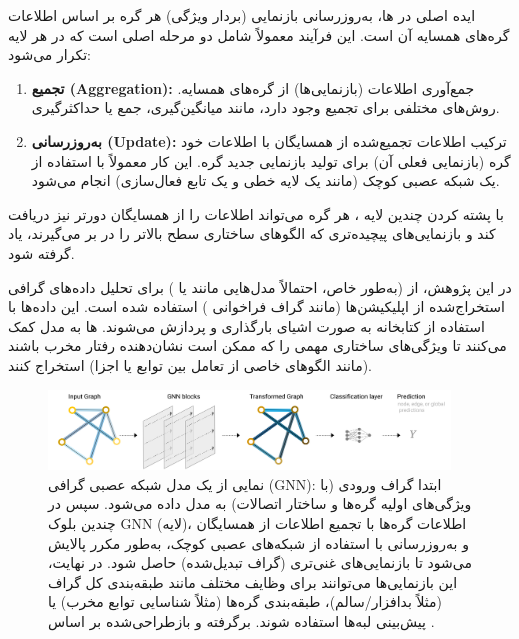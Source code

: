 ایده اصلی در ها، به‌روزرسانی بازنمایی (بردار ویژگی) هر گره بر اساس اطلاعات گره‌های همسایه آن است. این فرآیند معمولاً شامل دو مرحله اصلی است که در هر لایه  تکرار می‌شود:
\begin{enumerate}
    \item \textbf{تجمیع (Aggregation):} جمع‌آوری اطلاعات (بازنمایی‌ها) از گره‌های همسایه. روش‌های مختلفی برای تجمیع وجود دارد، مانند میانگین‌گیری، جمع یا حداکثرگیری.
    \item \textbf{به‌روزرسانی (Update):} ترکیب اطلاعات تجمیع‌شده از همسایگان با اطلاعات خود گره (بازنمایی فعلی آن) برای تولید بازنمایی جدید گره. این کار معمولاً با استفاده از یک شبکه عصبی کوچک (مانند یک لایه خطی و یک تابع فعال‌سازی) انجام می‌شود.
\end{enumerate}
با پشته کردن چندین لایه ، هر گره می‌تواند اطلاعات را از همسایگان دورتر نیز دریافت کند و بازنمایی‌های پیچیده‌تری که الگوهای ساختاری سطح بالاتر را در بر می‌گیرند، یاد گرفته شود.

در این پژوهش، از  (به‌طور خاص، احتمالاً مدل‌هایی مانند  \cite{Kipf2017} یا  \cite{Velickovic2018}) برای تحلیل داده‌های گرافی استخراج‌شده از اپلیکیشن‌ها (مانند گراف فراخوانی ) استفاده شده است. این داده‌ها با استفاده از کتابخانه  به صورت اشیای  بارگذاری و پردازش می‌شوند. ها به مدل کمک می‌کنند تا ویژگی‌های ساختاری مهمی را که ممکن است نشان‌دهنده رفتار مخرب باشند (مانند الگوهای خاصی از تعامل بین توابع یا اجزا) استخراج کنند.

\begin{figure}[!t]
    \centering
    \includegraphics[width=0.95\textwidth]{images/gnn_structure}
    \caption{نمایی از یک مدل شبکه عصبی گرافی (GNN): ابتدا گراف ورودی (با ویژگی‌های اولیه گره‌ها و ساختار اتصالات) به مدل داده می‌شود. سپس در چندین بلوک GNN (لایه)، اطلاعات گره‌ها با تجمیع اطلاعات از همسایگان و به‌روزرسانی با استفاده از شبکه‌های عصبی کوچک، به‌طور مکرر پالایش می‌شود تا بازنمایی‌های غنی‌تری (گراف تبدیل‌شده) حاصل شود. در نهایت، این بازنمایی‌ها می‌توانند برای وظایف مختلف مانند طبقه‌بندی کل گراف (مثلاً بدافزار/سالم)، طبقه‌بندی گره‌ها (مثلاً شناسایی توابع مخرب) یا پیش‌بینی لبه‌ها استفاده شوند. برگرفته و بازطراحی‌شده بر اساس \cite{sanchez-lengeling2021a}.}
    \label{fig:gnn_structure}
\end{figure}

